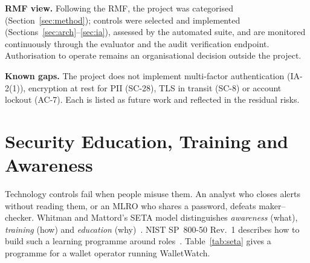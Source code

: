 \documentclass[conference,10pt]{IEEEtran}
\begin{document}
\textbf{RMF view.} Following the RMF, the project was categorised (Section~\ref{sec:method}); controls were
selected and implemented (Sections~\ref{sec:arch}--\ref{sec:ia}), assessed by the automated suite, and are monitored
continuously through the evaluator and the audit verification endpoint. Authorisation to operate
remains an organisational decision outside the project.

\textbf{Known gaps.} The project does not implement multi-factor authentication (IA-2(1)),
encryption at rest for PII (SC-28), TLS in transit (SC-8) or account lockout (AC-7). Each is listed
as future work and reflected in the residual risks.

\section{Security Education, Training and Awareness}\label{sec:seta}

Technology controls fail when people misuse them. An analyst who closes alerts without reading
them, or an MLRO who shares a password, defeats maker--checker. Whitman and Mattord's SETA model
distinguishes \emph{awareness} (what), \emph{training} (how) and \emph{education}
(why)~\cite{whitman2012principles}. NIST SP~800-50 Rev.~1 describes how to build such a learning
programme around roles~\cite{nist80050r1}. Table~\ref{tab:seta} gives a programme for a wallet
operator running WalletWatch.
\end{document}
